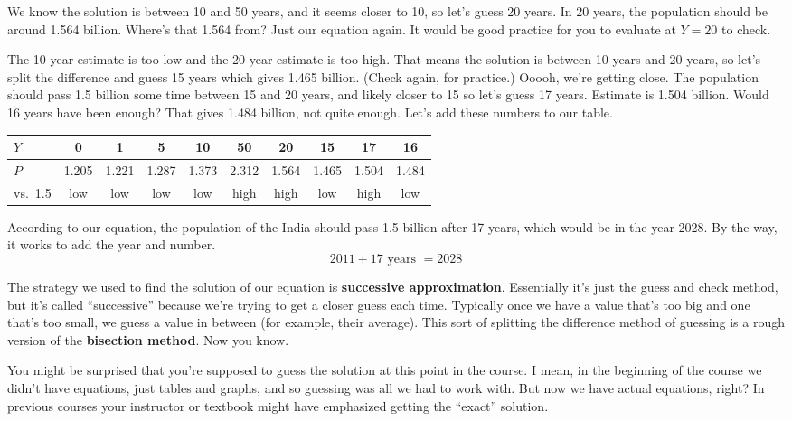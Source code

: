 We know the solution is between 10 and 50 years, and it seems closer to 10, so let's guess 20 years.  In 20 years, the population should be around 1.564 billion.  Where's that 1.564 from?  Just our equation again.  It would be good practice for you to evaluate at $Y=20$ to check.  

The 10 year estimate is too low and the 20 year estimate is too high.  That means the solution is between 10 years and 20 years, so let's split the difference and guess 15 years which gives 1.465 billion.  (Check again, for practice.)  Ooooh, we're getting close.  The population should pass 1.5 billion some time between 15 and 20 years, and likely closer to 15 so let's guess 17 years.  Estimate is  1.504 billion.  Would 16 years have been enough?  That gives 1.484 billion, not quite enough.  Let's add these numbers to our table.
\begin{center}
\begin{tabular} {|l| |c |c |c |c |c |c |c |c  |c|}\hline
$Y$ & 0 & 1 & 5 & 10 & 50 & 20 & 15 & 17& 16 \\ \hline
$P$ & 1.205 & 1.221 &1.287  & 1.373 & 2.312 & 1.564 & 1.465 &1.504  & 1.484  \\ \hline
vs.\ 1.5 & low & low & low & low & high & high & low & high & low \\ \hline
\end{tabular}
\end{center}

According to our equation, the population of the India should pass 1.5 billion after 17 years, which would be in the year 2028.  By the way,  it works to add the year and number. $$2011 + 17 \text{ years } = 2028$$

The strategy we used to find the solution of our equation is  \textbf{successive approximation}.  Essentially it's just the guess and check method, but it's called ``successive'' because we're trying to get a closer guess each time.  Typically once we have a value that's too big and one that's too small, we guess a value in between (for example, their average).  This sort of splitting the difference method of guessing is a rough version of the \textbf{bisection method}.  Now you know.

You might be surprised that you're supposed to guess the solution at this point in the course. I mean, in the beginning of the course we didn't have equations, just tables and graphs, and so guessing was all we had to work with.  But now we have actual equations, right?  In previous courses your instructor or textbook might have emphasized getting the ``exact'' solution.  

